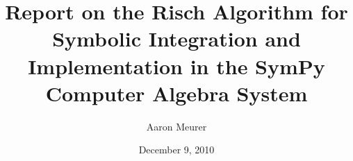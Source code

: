 \documentclass{beamer}
\title{Report on the Risch Algorithm for Symbolic
Integration and Implementation in the SymPy Computer Algebra System}
\author{Aaron Meurer}
\date{December 9, 2010}
\numberwithin{equation}{section} %
\begin{document}
\begin{frame}
    \titlepage
\end{frame}
\end{document}
